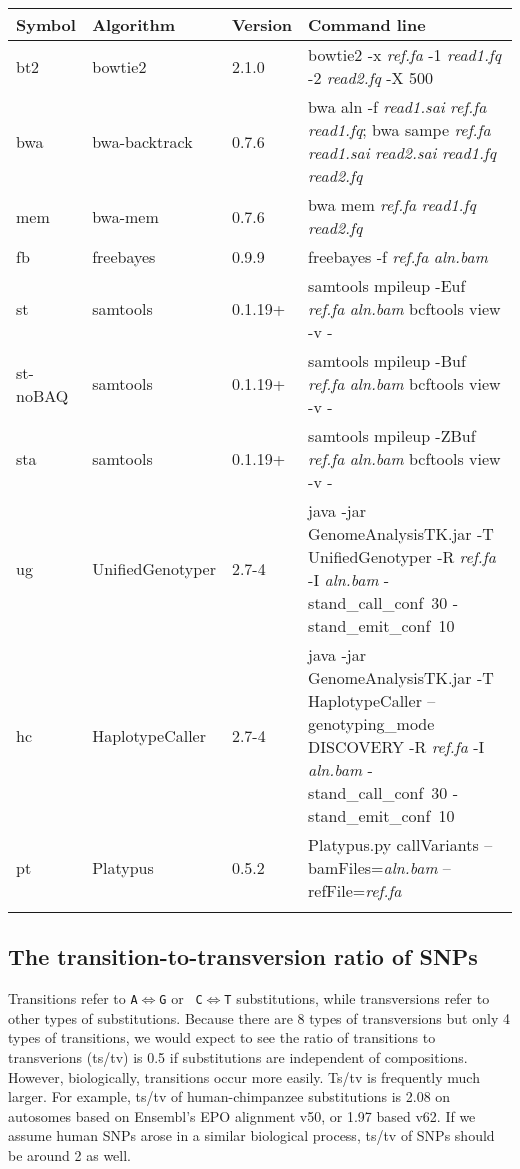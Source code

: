 \documentclass{bioinfo}
\begin{document}
\begin{table*}
\footnotesize
{}
{\begin{tabular*}{\textwidth}{@{\extracolsep{\fill}}lllp{12cm}}
\toprule
Symbol & Algorithm & Version & Command line \\
\midrule
bt2 & bowtie2 & 2.1.0 & bowtie2 -x \emph{ref.fa} -1 \emph{read1.fq} -2 \emph{read2.fq} -X 500 \\
bwa & bwa-backtrack & 0.7.6 & bwa aln -f \emph{read1.sai} \emph{ref.fa} \emph{read1.fq}; bwa sampe \emph{ref.fa} \emph{read1.sai} \emph{read2.sai} \emph{read1.fq} \emph{read2.fq} \\
mem & bwa-mem & 0.7.6 & bwa mem \emph{ref.fa} \emph{read1.fq} \emph{read2.fq} \\
fb & freebayes & 0.9.9 & freebayes -f \emph{ref.fa} \emph{aln.bam} \\
st & samtools & 0.1.19+ & samtools mpileup -Euf \emph{ref.fa} \emph{aln.bam} {\tt \char124} bcftools view -v - \\
st-noBAQ & samtools & 0.1.19+ & samtools mpileup -Buf \emph{ref.fa} \emph{aln.bam} {\tt \char124} bcftools view -v - \\
sta & samtools & 0.1.19+ & samtools mpileup -ZBuf \emph{ref.fa} \emph{aln.bam} {\tt \char124} bcftools view -v - \\
ug & UnifiedGenotyper & 2.7-4 & java -jar GenomeAnalysisTK.jar -T UnifiedGenotyper -R \emph{ref.fa} -I \emph{aln.bam} \mbox{-stand\_call\_conf 30} \mbox{-stand\_emit\_conf 10} \\
hc & HaplotypeCaller & 2.7-4 & java -jar GenomeAnalysisTK.jar -T HaplotypeCaller --genotyping\_mode DISCOVERY -R \emph{ref.fa} -I \emph{aln.bam} \mbox{-stand\_call\_conf 30} \mbox{-stand\_emit\_conf 10} \\
pt & Platypus & 0.5.2 & Platypus.py callVariants --bamFiles=\emph{aln.bam} --refFile=\emph{ref.fa} \\
\botrule
\end{tabular*}}{}
\end{table*}

\subsection{The transition-to-transversion ratio of SNPs}
Transitions refer to {\tt A}$\Leftrightarrow${\tt G} or {\tt
C}$\Leftrightarrow${\tt T} substitutions, while transversions refer to other
types of substitutions. Because there are 8 types of transversions but only 4
types of transitions, we would expect to see the ratio of transitions to
transverions (ts/tv) is 0.5 if substitutions are independent of compositions.
However, biologically, transitions occur more easily. Ts/tv is frequently much
larger. For example, ts/tv of human-chimpanzee substitutions is 2.08 on
autosomes based on Ensembl's EPO alignment v50, or 1.97 based v62. If we assume
human SNPs arose in a similar biological process, ts/tv of SNPs should be
around 2 as well.
\end{document}
